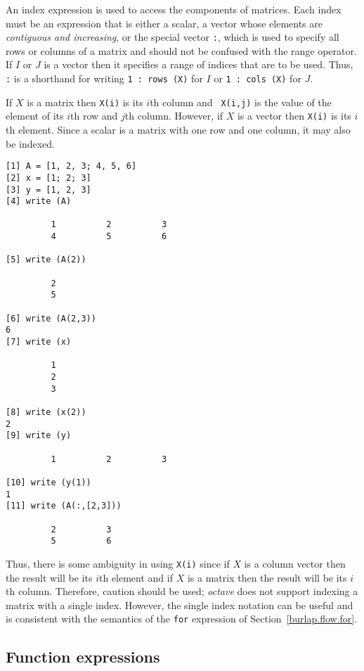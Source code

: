 An index expression is used to access the components of matrices.
Each index must be an expression that is either a scalar, a vector
whose elements are {\em contiguous and increasing}, or the special
vector {\tt :}, which is used to specify all rows or columns of a
matrix and should not be confused with the range operator.  If $I$ or
$J$ is a vector then it specifies a range of indices that are to be
used.  Thus, \verb$:$ is a shorthand for writing \verb$1 : rows (X)$
for $I$ or \verb$1 : cols (X)$ for $J$.

If $X$ is a matrix then {\tt X(i)} is its $i$th column and {\tt
X(i,j)} is the value of the element of its $i$th row and $j$th column.
However, if $X$ is a vector then {\tt X(i)} is its $i$th element.
Since a scalar is a matrix with one row and one column, it may also be
indexed.

\begin{screen}
\begin{verbatim}
[1] A = [1, 2, 3; 4, 5, 6] 
[2] x = [1; 2; 3]
[3] y = [1, 2, 3]
[4] write (A)

         1          2          3 
         4          5          6 

[5] write (A(2))

         2 
         5 

[6] write (A(2,3))
6
[7] write (x)

         1 
         2 
         3 

[8] write (x(2))
2
[9] write (y)

         1          2          3 

[10] write (y(1))
1
[11] write (A(:,[2,3]))

         2          3
         5          6
\end{verbatim}
\end{screen}

Thus, there is some ambiguity in using {\tt X(i)} since if $X$ is a
column vector then the result will be its $i$th element and if $X$ is
a matrix then the result will be its $i$th column.  Therefore, caution
should be used; {\em octave} does not support indexing a matrix with a
single index.  However, the single index notation can be useful and is
consistent with the semantics of the {\tt for} expression of
Section~\ref{burlap.flow.for}.


\subsection{Function expressions}
\label{burlap.syntax.function-call}

